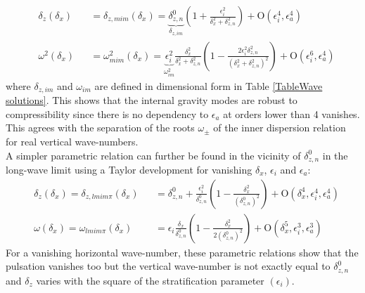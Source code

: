 \documentclass[a4paper,11pt]{article}
\begin{document}
\begin{subequations}
	\begin{alignat}{2}	
	\label{ParamallMIM1}
	&\delta_{z}(\delta_x) &&=\delta_{z,mim}(\delta_x)=
	\underbrace{\delta_{z,n}^0}_{\delta_{z,im}}
	\left(
	1+\frac{\epsilon_i^2}{\delta_x^2+\delta_{z,n}^2}
	\right)
	+\mathrm{O}	(\epsilon_i^4,\epsilon_a^4)\\[3mm]
	\label{ParamallMIM2}
	&\omega^2(\delta_x) &&=\omega_{mim}^2(\delta_x)=
	\underbrace{\epsilon_i^2}
	_{\omega^2_{im}}
	\frac{\delta_x^2}{\delta_x^2+\delta_{z,n}^2}
	\left(1-\frac{2\epsilon_i^2\delta_{z,n}^2}{(\delta_x^2+\delta_{z,n}^2)^2}\right)
	+\mathrm{O}	(\epsilon_i^6,\epsilon_a^4)
	\end{alignat}
\end{subequations}
where $\delta_{z,im}$ and $\omega_{im}$ are defined in dimensional form in Table \ref{TableWave solutions}. This shows that the internal gravity modes are robust to compressibility since there is no dependency to $\epsilon_a$ at orders lower than 4 vanishes. This agrees with the separation of the roots $\omega_\pm$ of the inner dispersion relation for real vertical wave-numbers.\\
A simpler parametric relation can further be found in the vicinity of $\delta_{z,n}^0$ in the long-wave limit using a Taylor development for vanishing $\delta_x$, $\epsilon_i$ and $\epsilon_a$:
\begin{subequations}
	   \label{EqParamInt}
	\begin{alignat}{2}	
	   \label{ParamMIM1}
		& \delta_z(\delta_x)=\delta_{z,lmim\pi}(\delta_x) &&= 
		\delta_{z,n}^0+\frac{\epsilon_i^2}{\delta_{z,n}^0} \left(
		1-\frac{\delta_x^2}{(\delta_{z,n}^0)^2} \right)
		+\mathrm{O}	(\delta_x^4,\epsilon_i^4,\epsilon_a^4)\\[3mm]
	   \label{ParamMIM2}
		& \omega(\delta_x)=\omega_{lmim\pi}(\delta_x) &&=\epsilon_i\frac{\delta_x}{\delta_{z,n}^0} 
		\left( 1
		-\frac{\delta_x^2}{2(\delta_{z,n}^0)^2} \right)
		+\mathrm{O}	(\delta_x^5,\epsilon_i^3,\epsilon_a^3)
	\end{alignat}
\end{subequations}
For a vanishing horizontal wave-number, these parametric relations show that the pulsation vanishes too but the vertical wave-number is not exactly equal to $\delta_{z,n}^0$ and $\delta_z$ varies with the square of the stratification parameter $(\epsilon_i)$.\\
\end{document}
